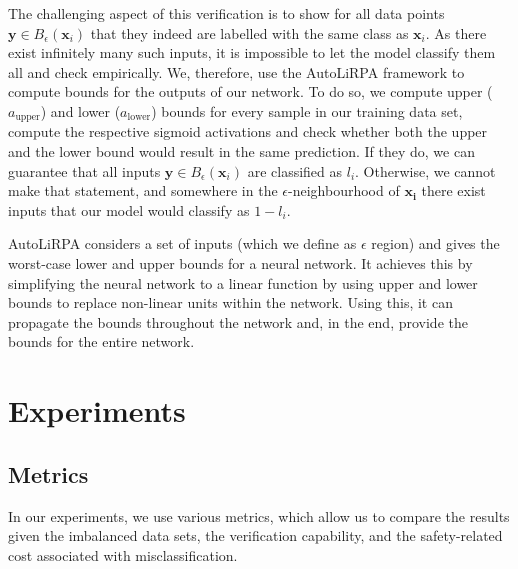 \documentclass[acmsmall,nonacm]{acmart}
\begin{document}
The challenging aspect of this verification is to show for all data points $\mathbf{y} \in B_\epsilon(\mathbf{x}_i)$ that they indeed are labelled with the same class as $\mathbf{x}_i$. As there exist infinitely many such inputs, it is impossible to let the model classify them all and check empirically. We, therefore, use the AutoLiRPA framework \cite{xu2020autoLiRPA} to compute bounds for the outputs of our network. To do so, we compute upper ($a_{\text{upper}}$) and lower ($a_{\text{lower}}$) bounds for every sample in our training data set, compute the respective sigmoid activations and check whether both the upper and the lower bound would result in the same prediction. If they do, we can guarantee that all inputs $\mathbf{y} \in B_\epsilon(\mathbf{x}_i)$ are classified as $l_i$. Otherwise, we cannot make that statement, and somewhere in the $\epsilon$-neighbourhood of $\mathbf{x_i}$ there exist inputs that our model would classify as $1-l_i$.

AutoLiRPA considers a set of inputs (which we define as $\epsilon$ region) and gives the worst-case lower and upper bounds for a neural network. It achieves this by simplifying the neural network to a linear function by using upper and lower bounds to replace non-linear units within the network. Using this, it can propagate the bounds throughout the network and, in the end, provide the bounds for the entire network.

\section{Experiments}


\subsection{Metrics}
In our experiments, we use various metrics, which allow us to compare the results given the imbalanced data sets, the verification capability, and the safety-related cost associated with misclassification.
\end{document}
